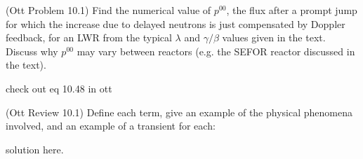 \documentclass[11pt,addpoints,answers]{exam}
\begin{document}
\begin{questions}

        
        \question[30] (Ott Problem 10.1) Find the numerical value of $p^{00}$, 
        the flux after a prompt jump for which the increase due to delayed 
        neutrons is just compensated by Doppler feedback, for an LWR from the 
        typical $\lambda$ and $\gamma/\beta$ values given in the text. Discuss 
        why $p^{00}$ may vary between reactors (e.g. the SEFOR reactor 
        discussed in the text).

        \begin{solution}
            check out eq 10.48 in ott
        \end{solution}

        \question[15] (Ott Review 10.1) Define each term, give an example of the 
        physical phenomena involved, and an example of a transient for each: 
        \begin{solution}
                solution here.
        \end{solution}
       
       
\end{questions}



%
%
\end{document}
